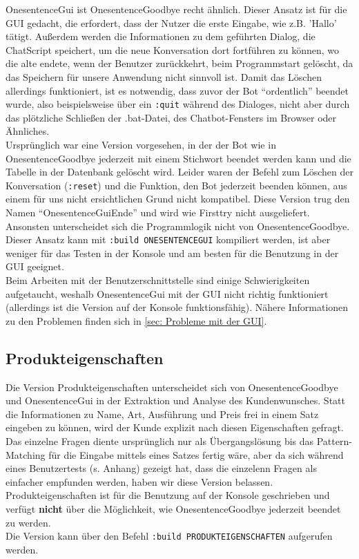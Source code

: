 OnesentenceGui ist OnesentenceGoodbye recht ähnlich. Dieser Ansatz ist für die GUI gedacht, die erfordert, dass der Nutzer die erste Eingabe, wie z.B. 'Hallo' tätigt. Außerdem werden die Informationen zu dem geführten Dialog, die ChatScript speichert, um die neue Konversation dort fortführen zu können, wo die alte endete, wenn der Benutzer zurückkehrt, beim Programmstart gelöscht, da das Speichern für unsere Anwendung nicht sinnvoll ist. Damit das Löschen allerdings funktioniert, ist es notwendig, dass zuvor der Bot "`ordentlich"' beendet wurde, also beispielsweise über ein \lstinline|:quit| während des Dialoges, nicht aber durch das plötzliche Schließen der .bat-Datei, des Chatbot-Fensters im Browser oder Ähnliches.\\
Ursprünglich war eine Version vorgesehen, in der der Bot wie in OnesentenceGoodbye jederzeit mit einem Stichwort beendet werden kann und die Tabelle in der Datenbank gelöscht wird. Leider waren der Befehl zum Löschen der Konversation (\lstinline|:reset|) und die Funktion, den Bot jederzeit beenden können, aus einem für uns nicht ersichtlichen Grund nicht kompatibel. Diese Version trug den Namen "`OnesentenceGuiEnde"' und wird wie Firsttry nicht ausgeliefert.\\
Ansonsten unterscheidet sich die Programmlogik nicht von OnesentenceGoodbye. Dieser Ansatz kann mit \lstinline|:build ONESENTENCEGUI| kompiliert werden, ist aber weniger für das Testen in der Konsole und am besten für die Benutzung in der GUI geeignet.\\
Beim Arbeiten mit der Benutzerschnittstelle sind einige Schwierigkeiten aufgetaucht, weshalb OnesentenceGui mit der GUI nicht richtig funktioniert (allerdings ist die Version auf der Konsole funktionsfähig). Nähere Informationen zu den Problemen finden sich in \ref{sec: Probleme mit der GUI}.\\

\subsection{Produkteigenschaften}
\label{sec:Produkteigenschaften}

Die Version Produkteigenschaften unterscheidet sich von OnesentenceGoodbye und OnesentenceGui in der Extraktion und Analyse des Kundenwunsches. Statt die Informationen zu Name, Art, Ausführung und Preis frei in einem Satz eingeben zu können, wird der Kunde explizit nach diesen Eigenschaften gefragt.\\
Das einzelne Fragen diente ursprünglich nur als Übergangslösung bis das Pattern-Matching für die Eingabe mittels eines Satzes fertig wäre, aber da sich während eines Benutzertests (s. Anhang) gezeigt hat, dass die einzelenn Fragen als einfacher empfunden werden, haben wir diese Version belassen.\\
Produkteigenschaften ist für die Benutzung auf der Konsole geschrieben und verfügt \textbf{nicht} über die Möglichkeit, wie OnesentenceGoodbye jederzeit beendet zu werden.\\
Die Version kann über den Befehl \lstinline|:build PRODUKTEIGENSCHAFTEN| aufgerufen werden.